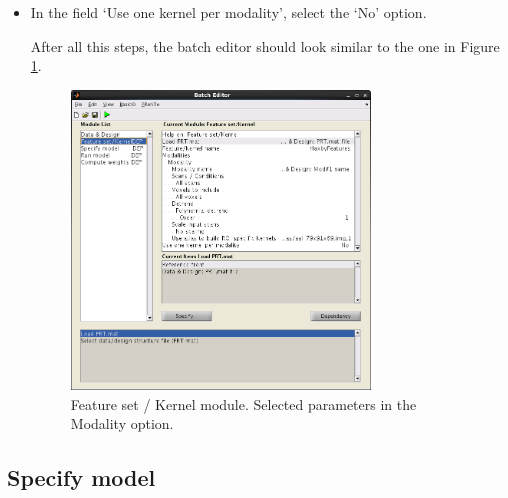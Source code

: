 \begin{itemize}
\begin{itemize}
	\item In the `Detrend' field, select `Polynomial detrend' option with order 1;
	
	\item In the `Scale input scans' field, select `No scaling' option;
	
	\item In the `Use atlas to build ROI specific kernels', select an atlas file AAL (named `aal\_79x91x69) available in the PRoNTo directory (PRoNTo/atlas/).
 	
	\end{itemize}
	
\item In the field `Use one kernel per modality', select the `No' option.	

After all this steps, the batch editor should look similar to the one in Figure \ref{fig:batchModalitymkl}.
	
	\begin{figure}[!h]
	\centering
		\includegraphics[width=0.75\textwidth]{images/Tutorial/mkl/batchModalitymkl.png}
	\caption{Feature set / Kernel module. Selected parameters in the Modality option.}
	\label{fig:batchModalitymkl}
\end{figure}
	

\end{itemize}


\subsection{Specify model}

